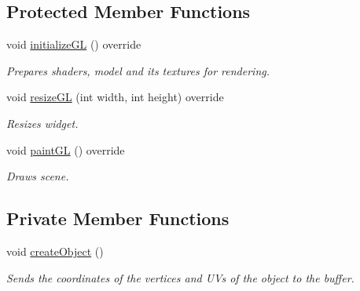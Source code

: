 \subsection*{Protected Member Functions}
\begin{DoxyCompactItemize}
\item 
void \mbox{\hyperlink{class_open_g_l_widget_a4baa372aec232a8d6c153cdef540dc11}{initialize\+GL}} () override
\begin{DoxyCompactList}\small\item\em Prepares shaders, model and its textures for rendering. \end{DoxyCompactList}\item 
void \mbox{\hyperlink{class_open_g_l_widget_a1bdb72bca1dda9243983c71c8a3e0157}{resize\+GL}} (int width, int height) override
\begin{DoxyCompactList}\small\item\em Resizes widget. \end{DoxyCompactList}\item 
void \mbox{\hyperlink{class_open_g_l_widget_a86df33a6b58b77588ffb1c110fcf2932}{paint\+GL}} () override
\begin{DoxyCompactList}\small\item\em Draws scene. \end{DoxyCompactList}\end{DoxyCompactItemize}
\subsection*{Private Member Functions}
\begin{DoxyCompactItemize}
\item 
void \mbox{\hyperlink{class_open_g_l_widget_ae8a75e2562bae0ea90f590f0a6ddadcc}{create\+Object}} ()
\begin{DoxyCompactList}\small\item\em Sends the coordinates of the vertices and UV\textquotesingle{}s of the object to the buffer. \end{DoxyCompactList}\end{DoxyCompactItemize}
